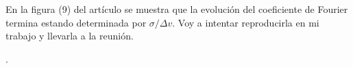 \documentclass[notitlepage,letterpaper,12pt]{article} %
\begin{document}
En la figura (9) del artículo se muestra que la evolución del coeficiente de Fourier termina estando determinada por $\sigma / \Delta v$.
Voy a intentar reproducirla en mi trabajo y llevarla a la reunión.






.
\end{document}
